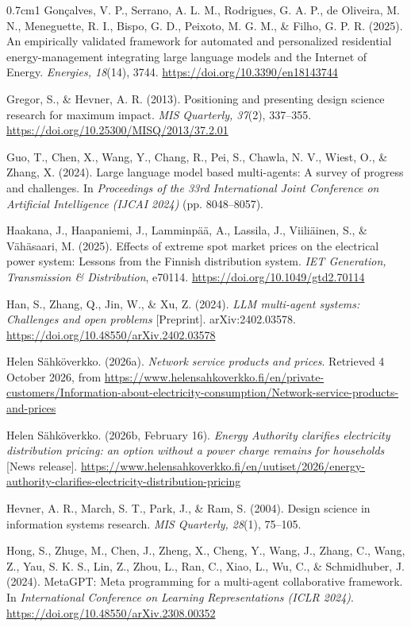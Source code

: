 \documentclass[12pt,a4paper]{report}
\begin{document}
\begin{hangparas}{0.7cm}{1}
Gonçalves, V. P., Serrano, A. L. M., Rodrigues, G. A. P., de Oliveira,
M. N., Meneguette, R. I., Bispo, G. D., Peixoto, M. G. M., \& Filho, G.
P. R. (2025). An empirically validated framework for automated and
personalized residential energy-management integrating large language
models and the Internet of Energy. \textit{Energies, 18}(14), 3744.
\url{https://doi.org/10.3390/en18143744}

Gregor, S., \& Hevner, A. R. (2013). Positioning and presenting design
science research for maximum impact. \textit{MIS Quarterly, 37}(2),
337--355. \url{https://doi.org/10.25300/MISQ/2013/37.2.01}

Guo, T., Chen, X., Wang, Y., Chang, R., Pei, S., Chawla, N. V., Wiest,
O., \& Zhang, X. (2024). Large language model based multi-agents: A
survey of progress and challenges. In \textit{Proceedings of the 33rd
International Joint Conference on Artificial Intelligence (IJCAI 2024)}
(pp. 8048--8057).

Haakana, J., Haapaniemi, J., Lamminpää, A., Lassila, J., Viiliäinen, S.,
\& Vähäsaari, M. (2025). Effects of extreme spot market prices on the
electrical power system: Lessons from the Finnish distribution system.
\textit{IET Generation, Transmission \& Distribution}, e70114.
\url{https://doi.org/10.1049/gtd2.70114}

Han, S., Zhang, Q., Jin, W., \& Xu, Z. (2024). \textit{LLM multi-agent
systems: Challenges and open problems} [Preprint]. arXiv:2402.03578.
\url{https://doi.org/10.48550/arXiv.2402.03578}

Helen Sähköverkko. (2026a). \textit{Network service products and
prices}. Retrieved 4 October 2026, from
\url{https://www.helensahkoverkko.fi/en/private-customers/Information-about-electricity-consumption/Network-service-products-and-prices}

Helen Sähköverkko. (2026b, February 16). \textit{Energy Authority
clarifies electricity distribution pricing: an option without a power
charge remains for households} [News release].
\url{https://www.helensahkoverkko.fi/en/uutiset/2026/energy-authority-clarifies-electricity-distribution-pricing}

Hevner, A. R., March, S. T., Park, J., \& Ram, S. (2004). Design
science in information systems research. \textit{MIS Quarterly, 28}(1),
75--105.

Hong, S., Zhuge, M., Chen, J., Zheng, X., Cheng, Y., Wang, J., Zhang,
C., Wang, Z., Yau, S. K. S., Lin, Z., Zhou, L., Ran, C., Xiao, L., Wu,
C., \& Schmidhuber, J. (2024). MetaGPT: Meta programming for a
multi-agent collaborative framework. In \textit{International Conference
on Learning Representations (ICLR 2024)}.
\url{https://doi.org/10.48550/arXiv.2308.00352}


\end{hangparas}
\end{document}
